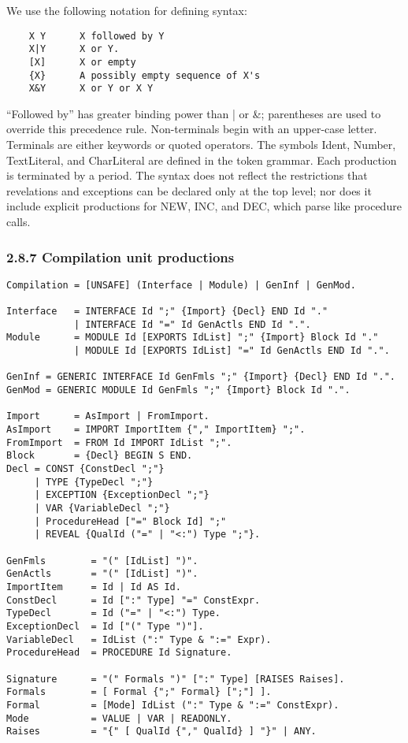 \documentclass[10pt]{article}
\begin{document}
  We use the following notation for defining syntax: 
\begin{verbatim}
    X Y      X followed by Y
    X|Y      X or Y.  
    [X]      X or empty
    {X}      A possibly empty sequence of X's 
    X&Y      X or Y or X Y
\end{verbatim}
 ``Followed by'' has greater binding power than | or \&; parentheses are used to override this precedence rule. Non-terminals begin with an upper-case letter. Terminals are either keywords or quoted operators. The symbols Ident, Number, TextLiteral, and CharLiteral are defined in the token grammar. Each production is terminated by a period. The syntax does not reflect the restrictions that revelations and exceptions can be declared only at the top level; nor does it include explicit productions for NEW, INC, and DEC, which parse like procedure calls. 


 
\subsubsection*{2.8.7 Compilation unit productions}


 
\begin{verbatim}
Compilation = [UNSAFE] (Interface | Module) | GenInf | GenMod.

Interface   = INTERFACE Id ";" {Import} {Decl} END Id "."
            | INTERFACE Id "=" Id GenActls END Id ".".
Module      = MODULE Id [EXPORTS IdList] ";" {Import} Block Id "."
            | MODULE Id [EXPORTS IdList] "=" Id GenActls END Id ".".

GenInf = GENERIC INTERFACE Id GenFmls ";" {Import} {Decl} END Id ".".
GenMod = GENERIC MODULE Id GenFmls ";" {Import} Block Id ".".

Import      = AsImport | FromImport.
AsImport    = IMPORT ImportItem {"," ImportItem} ";".
FromImport  = FROM Id IMPORT IdList ";".
Block       = {Decl} BEGIN S END.
Decl = CONST {ConstDecl ";"}
     | TYPE {TypeDecl ";"}
     | EXCEPTION {ExceptionDecl ";"}
     | VAR {VariableDecl ";"}
     | ProcedureHead ["=" Block Id] ";" 
     | REVEAL {QualId ("=" | "<:") Type ";"}.

GenFmls        = "(" [IdList] ")".
GenActls       = "(" [IdList] ")".
ImportItem     = Id | Id AS Id.
ConstDecl      = Id [":" Type] "=" ConstExpr.
TypeDecl       = Id ("=" | "<:") Type.
ExceptionDecl  = Id ["(" Type ")"].
VariableDecl   = IdList (":" Type & ":=" Expr).
ProcedureHead  = PROCEDURE Id Signature.

Signature      = "(" Formals ")" [":" Type] [RAISES Raises].
Formals        = [ Formal {";" Formal} [";"] ].
Formal         = [Mode] IdList (":" Type & ":=" ConstExpr).
Mode           = VALUE | VAR | READONLY.
Raises         = "{" [ QualId {"," QualId} ] "}" | ANY.
\end{verbatim}
\end{document}
